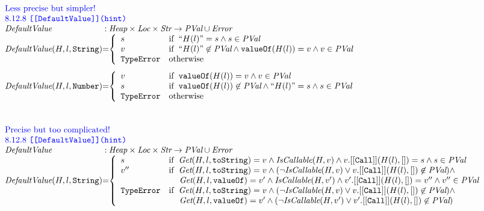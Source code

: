 \documentclass[a4paper, leqno]{amsart}
\def\inblue{\color{blue}}
\newcommand{\Error}{\emph{Error}}
\newcommand{\te}{{\tt TypeError}}
\newcommand{\pval}{\emph{PVal}}
\newcommand{\Loc}{\emph{Loc}}
\newcommand{\Str}{\emph{Str}}
\newcommand{\Heap}{\emph{Heap}}
\newcommand{\hf}[1]{\emph{#1}}
\newcommand{\ifc}[1]{{\rm if}\begin{array}[t]{l}#1\end{array}}
\def\inblue{\color{blue}}
\begin{document}
\[\begin{array}{l@{}c@{}l}
\multicolumn{3}{l}{\mbox{\inblue Less precise but simpler!}}\\
\multicolumn{3}{l}{\mbox{\inblue 8.12.8 {\tt [[DefaultValue]](hint)}}}\\
\hf{DefaultValue} & :& \Heap \times \Loc \times \Str \rightarrow \pval \cup \Error \\
\hf{DefaultValue}(H,l,{\tt String}) &=&
\left\{\begin{array}{ll}
s   & \ifc{``H(l)" = s \wedge s \in\pval} \\%
v & \ifc{``H(l)" \not\in\pval \wedge {\tt valueOf}(H(l)) = v \wedge v\in\pval}\\%
\te & \mbox{otherwise}
\end{array}\right.
\\[2em]

\hf{DefaultValue}(H,l,{\tt Number}) &=&
\left\{\begin{array}{ll}
v & \ifc{{\tt valueOf}(H(l)) = v \wedge v\in\pval} \\%
s & \ifc{{\tt valueOf}(H(l)) \not\in \pval \wedge ``H(l)" = s \wedge s\in\pval}\\%
\te & \mbox{otherwise}
\end{array}\right.
\\[4em]

\multicolumn{3}{l}{\mbox{\inblue Precise but too complicated!}}\\
\multicolumn{3}{l}{\mbox{\inblue 8.12.8 {\tt [[DefaultValue]](hint)}}}\\
\hf{DefaultValue} & :& \Heap \times \Loc \times \Str \rightarrow \pval \cup \Error \\
\hf{DefaultValue}(H,l,{\tt String}) &=&
\left\{\begin{array}{ll}
s   & \ifc{\hf{Get}(H,l,{\tt toString}) = v \wedge
\hf{IsCallable}(H,v) \wedge
v.{\tt[[Call]]}(H(l), []) = s \wedge
s\in\pval} \\
v'' & \ifc{\hf{Get}(H,l,{\tt toString}) = v \wedge
(\neg \hf{IsCallable}(H,v) \vee
v.{\tt[[Call]]}(H(l), []) \not\in\pval) \wedge} \\
& \mbox{\phantom{if \ }$
\hf{Get}(H,l,{\tt valueOf}) = v' \wedge
\hf{IsCallable}(H,v') \wedge
v'.{\tt[[Call]]}(H(l), []) = v'' \wedge
v''\in\pval$}\\
\te & \ifc{\hf{Get}(H,l,{\tt toString}) = v \wedge
(\neg \hf{IsCallable}(H,v) \vee
v.{\tt[[Call]]}(H(l), []) \not\in\pval) \wedge} \\
& \mbox{\phantom{if \ }$
\hf{Get}(H,l,{\tt valueOf}) = v' \wedge
(\neg \hf{IsCallable}(H,v') \vee
v'.{\tt[[Call]]}(H(l), []) \not\in\pval)$}
\end{array}\right.
\\[2em]


\end{array}\]
\end{document}
